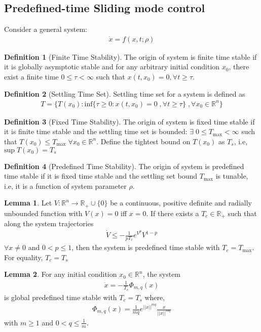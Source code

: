 \documentclass[]{article}
\theoremstyle{remark}
\theoremstyle{definition}
\newtheorem{definition}{Definition}
\newtheorem{lemma}{Lemma}
\begin{document}
	\subsection{Predefined-time Sliding mode control}
	Consider a general system:
	\begin{align}
		\dot x = f(x,t;\rho)
	\end{align}
	\begin{definition}[Finite Time Stability] The origin of system is finite time stable if it is globally asymptotic stable and for any arbitrary initial condition $x_0$, there exist a finite time $0\leq\tau< \infty$ such that $x(t,x_0) = 0, \forall t\geq\tau$.    
	\end{definition}
	\begin{definition}[Settling Time Set] Settling time set for a system is defined as \begin{align}
			T = \{T(x_0): \text{inf}\{\tau\geq0 : x(t,x_0) = 0\; ,\forall t\geq\tau \}
			\;,\forall x_0\in \mathbb{R}^n  \}
		\end{align}    
	\end{definition}
	\begin{definition}[Fixed Time Stability] The origin of system is fixed time stable if it is finite time stable and the settling time set is bounded: $\exists \;0\leq T_{\text{max}}< \infty$ such that $ T(x_0) \leq T_{\text{max}} \; \forall x_0 \in \mathbb{R}^n$.  Define the tightest bound on $ T(x_0) $ as $ T_s $, i.e, $ \text{sup}\; T(x_0) = T_s $ 
	\end{definition}
	\begin{definition}[Predefined Time Stability]
		The origin of system is predefined time stable if it is fixed time stable and the settling set bound $T_{\text{max}}$ is tunable, i.e, it is a function of system parameter $\rho$.
	\end{definition}
	\begin{lemma}
		Let $V:\mathbb{R}^n \to \mathbb{R}_{+}\cup \{0\}$ be a continuous, positive definite and radially unbounded function with $ V(x) = 0 $ iff $ x = 0 $. If there exists a $ T_c \in \mathbb{R_{+}}$ such that along the system trajectories \begin{align}
			\dot V \leq -\frac{1}{pT_c}e^{V^p}V^{1-p} 
			\end{align} 
		$ \forall x \neq 0 $ and $ 0<p\leq 1 $, then the system is predefined time stable with $ T_c = T_{\text{max}} $. For equality, $ T_c = T_s $
	\end{lemma}
\begin{lemma}
	For any initial condition $ x_0 \in \mathbb{R}^n $, the system \begin{align}
		\dot x = -\frac{1}{T_c}\Phi_{m,q}(x)
	\end{align}
is global predefined time stable with $ T_c = T_s $ where, \begin{align}
	\Phi_{m,q}(x) = \frac{1}{mq}e^{||x||^{mq}}\frac{x}{||x||^{mq}} 
\end{align}
with $ m\geq1 $ and $ 0<q\leq\frac{1}{m} $.
\end{lemma}
\end{document}
